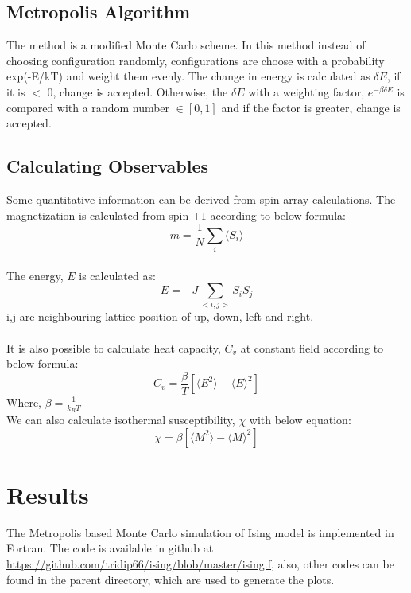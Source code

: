 \documentclass[]{article}
\begin{document}
\subsection{Metropolis Algorithm}
The method is a modified Monte Carlo scheme. In this method instead of choosing configuration randomly, configurations are choose with a probability exp(-E/kT) and weight them evenly.
The change in energy is calculated as $\delta E$, if it is $<$ 0, change is accepted. Otherwise, the $\delta E$ with a weighting factor, $e^{-\beta \delta E}$ is compared with a random number $\in [0,1] $ and if the factor is greater, change is accepted.
\\
\subsection{Calculating Observables}
Some quantitative information can be derived from spin array calculations. The magnetization is calculated from spin $\pm 1$ according to below formula:
\begin{equation} 
  m = \frac{1}{N}\sum_{i} \langle S_i \rangle
\end{equation}
\\
The energy, $E$ is calculated as:
\begin{equation} 
  E = - J \sum_{<i,j>} S_i S_j
\end{equation}
i,j are neighbouring lattice position of up, down, left and right.\\
\\
It is also possible to calculate heat capacity, $C_v$ at constant field according to below formula:
\begin{equation} 
  C_v = \frac{\beta}{T}[\langle E^2 \rangle - \langle E \rangle ^2]
\end{equation}
Where, $\beta = \frac{1}{k_B T}$ \\

We can also calculate isothermal susceptibility, $\chi$ with below equation:
\begin{equation} 
  \chi = \beta[\langle M^2 \rangle - \langle M \rangle ^2]
\end{equation}

\section{Results}
The Metropolis based Monte Carlo simulation of Ising model is implemented in Fortran. The code is available in github at \url{https://github.com/tridip66/ising/blob/master/ising.f}, also, other codes can be found in the parent directory, which are used 
to generate the plots.
\end{document}
